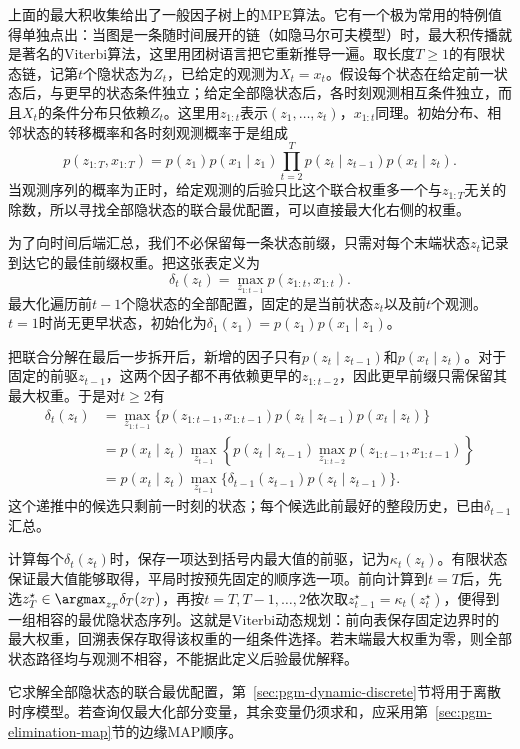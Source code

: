 上面的最大积收集给出了一般因子树上的MPE算法。它有一个极为常用的特例值得单独点出：当图是一条随时间展开的链（如隐马尔可夫模型）时，最大积传播就是著名的Viterbi算法，这里用团树语言把它重新推导一遍。取长度$T\geq1$的有限状态链，记第$t$个隐状态为$Z_t$，已给定的观测为$X_t=x_t$。假设每个状态在给定前一状态后，与更早的状态条件独立；给定全部隐状态后，各时刻观测相互条件独立，而且$X_t$的条件分布只依赖$Z_t$。这里用$z_{1:t}$表示$(z_1,\ldots,z_t)$，$x_{1:t}$同理。初始分布、相邻状态的转移概率和各时刻观测概率于是组成
\[
  p(z_{1:T},x_{1:T})
    =p(z_1)p(x_1\mid z_1)
      \prod_{t=2}^{T}p(z_t\mid z_{t-1})p(x_t\mid z_t).
\]
当观测序列的概率为正时，给定观测的后验只比这个联合权重多一个与$z_{1:T}$无关的除数，所以寻找全部隐状态的联合最优配置，可以直接最大化右侧的权重。

为了向时间后端汇总，我们不必保留每一条状态前缀，只需对每个末端状态$z_t$记录到达它的最佳前缀权重。把这张表定义为
\[
  \delta_t(z_t)
    =\max_{z_{1:t-1}}p(z_{1:t},x_{1:t}).
\]
最大化遍历前$t-1$个隐状态的全部配置，固定的是当前状态$z_t$以及前$t$个观测。$t=1$时尚无更早状态，初始化为$\delta_1(z_1)=p(z_1)p(x_1\mid z_1)$。

把联合分解在最后一步拆开后，新增的因子只有$p(z_t\mid z_{t-1})$和$p(x_t\mid z_t)$。对于固定的前驱$z_{t-1}$，这两个因子都不再依赖更早的$z_{1:t-2}$，因此更早前缀只需保留其最大权重。于是对$t\geq2$有
\[
  \begin{aligned}
    \delta_t(z_t)
      &=\max_{z_{1:t-1}}
        \bigl\{p(z_{1:t-1},x_{1:t-1})
          p(z_t\mid z_{t-1})p(x_t\mid z_t)\bigr\}\\
      &=p(x_t\mid z_t)\max_{z_{t-1}}
        \left\{p(z_t\mid z_{t-1})
          \max_{z_{1:t-2}}p(z_{1:t-1},x_{1:t-1})\right\}\\
      &=p(x_t\mid z_t)
        \max_{z_{t-1}}\{\delta_{t-1}(z_{t-1})p(z_t\mid z_{t-1})\}.
  \end{aligned}
\]
这个递推中的候选只剩前一时刻的状态；每个候选此前最好的整段历史，已由$\delta_{t-1}$汇总。

计算每个$\delta_t(z_t)$时，保存一项达到括号内最大值的前驱，记为$\kappa_t(z_t)$。有限状态保证最大值能够取得，平局时按预先固定的顺序选一项。前向计算到$t=T$后，先选$z_T^\star\in\argmax_{z_T}\delta_T(z_T)$，再按$t=T,T-1,\ldots,2$依次取$z_{t-1}^\star=\kappa_t(z_t^\star)$，便得到一组相容的最优隐状态序列。这就是Viterbi动态规划：前向表保存固定边界时的最大权重，回溯表保存取得该权重的一组条件选择。若末端最大权重为零，则全部状态路径均与观测不相容，不能据此定义后验最优解释。

它求解全部隐状态的联合最优配置，第~\ref{sec:pgm-dynamic-discrete}节将用于离散时序模型。若查询仅最大化部分变量，其余变量仍须求和，应采用第~\ref{sec:pgm-elimination-map}节的边缘MAP顺序。

